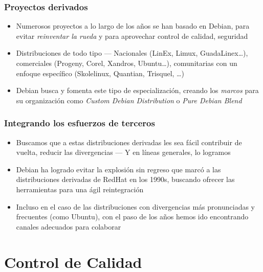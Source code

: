 \documentclass{beamer}
\begin{document}
\begin{frame}
  \frametitle {Proyectos derivados}
  \begin{itemize} 
  \item Numerosos proyectos a lo largo de los años se han basado en
    Debian, para evitar {\em reinventar la rueda} y para aprovechar
    control de calidad, seguridad
  \item Distribuciones de todo tipo — Nacionales (LinEx, Limux,
    GuadaLinex…), comerciales (Progeny, Corel, Xandros, Ubuntu…),
    comunitarias con un enfoque específico (Skolelinux, Quantian,
    Trisquel, …)
  \item Debian busca y fomenta este tipo de especialización, creando
    los {\em marcos} para su organización como {\em Custom Debian
      Distribution} o {\em Pure Debian Blend}
  \end{itemize}
\end{frame}

\begin{frame}
  \frametitle {Integrando los esfuerzos de terceros}
  \begin{itemize} 
  \item Buscamos que a estas distribuciones derivadas les sea fácil
    contribuir de vuelta, reducir las divergencias — Y en líneas
    generales, lo logramos
  \item Debian ha logrado evitar la explosión sin regreso que marcó a
    las distribuciones derivadas de RedHat en los 1990s, buscando
    ofrecer las herramientas para una ágil reintegración
  \item Incluso en el caso de las distribuciones con divergencias más
    pronunciadas y frecuentes (como Ubuntu), con el paso de los años
    hemos ido encontrando canales adecuados para colaborar
  \end{itemize}
\end{frame}

\section[QA]{Control de Calidad}
\end{document}
